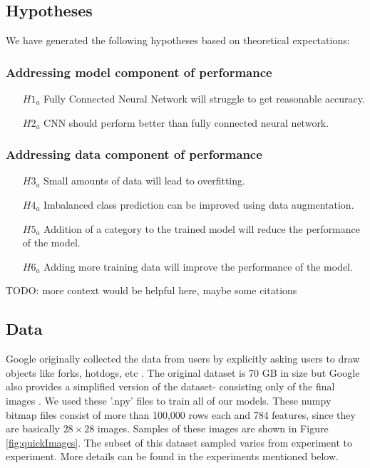 \documentclass[12pt]{article}
\begin{document}
\subsection{Hypotheses}

We have generated the following hypotheses based on theoretical
expectations:

\subsubsection{Addressing model component of performance}

\begin{itemize}
  \item[$H1_a$] Fully Connected Neural Network will struggle to get reasonable
    accuracy.
  \item[$H2_a$] CNN should perform better than fully connected neural network.
  \end{itemize}

\subsubsection{Addressing data component of performance}

\begin{itemize}
\item[$H3_a$] Small amounts of data will lead to overfitting.
\item[$H4_a$] Imbalanced class prediction can be improved using data
  augmentation.
\item[$H5_a$] Addition of a category to the trained model will reduce the
  performance of the model.
\item[$H6_a$] Adding more training data will improve the performance of the
  model.
\end{itemize}

TODO: more context would be helpful here, maybe some citations

\subsection{Data}

Google originally collected the data from users by explicitly asking users to
draw objects like forks, hotdogs, etc \cite{QuickDra91:online}. The original
dataset is 70 GB in size but Google also provides a simplified version of the
dataset- consisting only of the final images \cite{googlecr61:online}. We
used these '.npy' files to train all of our models. These numpy bitmap files
consist of more than 100,000 rows each and 784
features, since they are basically $28 \times 28$ images. Samples of these
images are shown in Figure \ref{fig:quickImages}. The subset of this
dataset sampled varies from experiment to experiment. More details can be
found in the experiments mentioned below.
\end{document}
